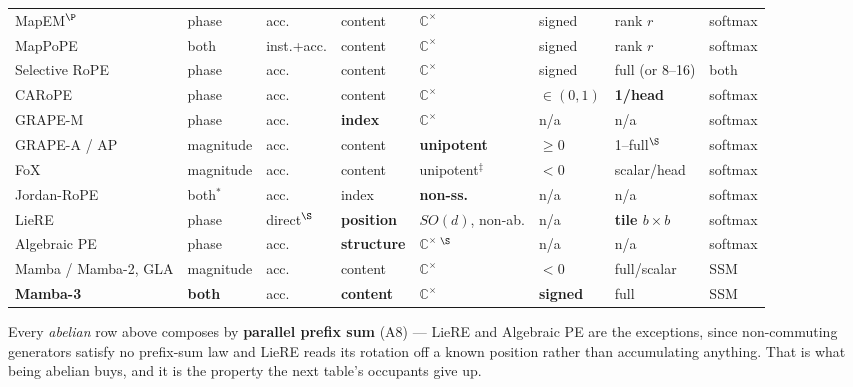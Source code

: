 \documentclass[11pt]{article}
\newcommand{\C}{\mathbb{C}}
\begin{document}
\begin{table}
\begin{tabular}{llllllll}
MapEM$^{\P}$      & phase      & acc.    & content & $\C^\times$ & signed & rank $r$ & softmax \\
MapPoPE           & both       & inst.+acc. & content & $\C^\times$ & signed & rank $r$ & softmax \\
Selective RoPE    & phase      & acc.    & content & $\C^\times$ & signed & full (or 8--16) & both \\
CARoPE            & phase      & acc.    & content & $\C^\times$ & \textbf{$\in(0,1)$} & \textbf{1/head} & softmax \\
\midrule
GRAPE-M           & phase      & acc.    & \textbf{index} & $\C^\times$ & n/a & n/a  & softmax \\
GRAPE-A / AP      & magnitude  & acc.    & content & \textbf{unipotent} & \textbf{$\ge 0$} & 1--full$^{\S}$ & softmax \\
FoX               & magnitude  & acc.    & content & unipotent$^\ddagger$  & $<0$    & scalar/head & softmax \\
Jordan-RoPE       & both$^\ast$ & acc.   & index   & \textbf{non-ss.} & n/a & n/a & softmax \\
LieRE             & phase      & direct$^{\S}$ & \textbf{position} & $SO(d)$, non-ab. & n/a & \textbf{tile $b\!\times\!b$} & softmax \\
Algebraic PE      & phase      & acc.    & \textbf{structure} & $\C^\times$\,$^{\S}$ & n/a & n/a & softmax \\
\midrule
Mamba / Mamba-2, GLA & magnitude & acc.  & content & $\C^\times$ & $<0$   & full/scalar & SSM \\
\textbf{Mamba-3}  & \textbf{both} & acc. & \textbf{content} & $\C^\times$ & \textbf{signed} & full & SSM \\
\bottomrule
\end{tabular}
\end{table}

\noindent Every \emph{abelian} row above composes by \textbf{parallel prefix sum} (A8) --- LieRE and Algebraic PE are the exceptions, since non-commuting generators satisfy no prefix-sum law and LieRE reads its rotation off a known position rather than accumulating anything. That
is what being abelian buys, and it is the property the next table's occupants give
up.
\end{document}
